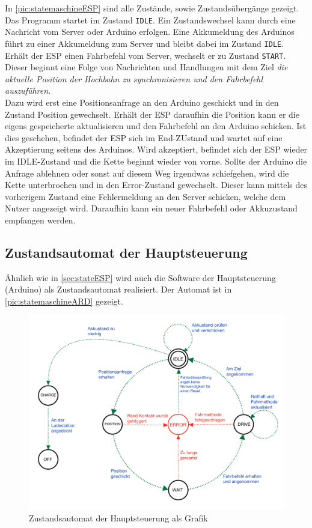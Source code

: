 \newpage
In \autoref{pic:statemaschineESP} sind alle Zustände, sowie Zustandsübergänge gezeigt. Das Programm startet im Zustand \texttt{IDLE}. Ein Zustandswechsel kann durch eine Nachricht vom Server oder Arduino erfolgen. Eine Akkumeldung des Arduinos führt zu einer Akkumeldung zum Server und bleibt dabei im Zustand \texttt{IDLE}.
Erhält der ESP einen Fahrbefehl vom Server, wechselt er zu Zustand \texttt{START}. Dieser beginnt eine Folge von Nachrichten und Handlungen mit dem Ziel \textit{die aktuelle Position der Hochbahn zu synchronisieren und den Fahrbefehl auszuführen}. \\
Dazu wird erst eine Positionsanfrage an den Arduino geschickt und in den Zustand Position gewechselt. Erhält der ESP daraufhin die Position kann er die eigens gespeicherte aktualisieren und den Fahrbefehl an den Arduino schicken. Ist dies geschehen, befindet der ESP sich im End-ZUstand und wartet auf eine Akzeptierung seitens des Arduinos. Wird akzeptiert, befindet sich der ESP wieder im IDLE-Zustand und die Kette beginnt wieder von vorne. Sollte der Arduino die Anfrage ablehnen oder sonst auf diesem Weg irgendwas schiefgehen, wird die Kette unterbrochen und in den Error-Zustand gewechselt. Dieser kann mittels des vorherigem Zustand eine Fehlermeldung an den Server schicken, welche dem Nutzer angezeigt wird. Daraufhin kann ein neuer Fahrbefehl oder Akkuzustand empfangen werden. 

\subsection{Zustandsautomat der Hauptsteuerung}
\label{sec:stateARD}
Ähnlich wie in \autoref{sec:stateESP} wird auch die Software der Hauptsteuerung (Arduino) als Zustandsautomat realisiert. 
Der Automat ist in \autoref{pic:statemaschineARD} gezeigt.

\begin{figure}[h]
	\begin{center}
		\includegraphics[width=17cm]{stateMaschineARD.pdf}
		\caption{\label{pic:statemaschineARD}Zustandsautomat der Hauptsteuerung als Grafik}
	\end{center}
\end{figure}

